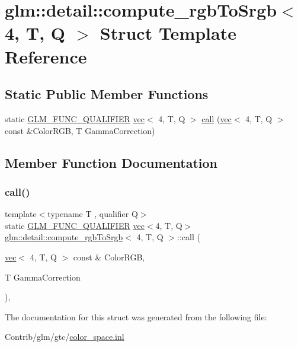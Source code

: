 \hypertarget{structglm_1_1detail_1_1compute__rgb_to_srgb_3_014_00_01_t_00_01_q_01_4}{}\section{glm\+:\+:detail\+:\+:compute\+\_\+rgb\+To\+Srgb$<$ 4, T, Q $>$ Struct Template Reference}
\label{structglm_1_1detail_1_1compute__rgb_to_srgb_3_014_00_01_t_00_01_q_01_4}
\subsection*{Static Public Member Functions}
\begin{DoxyCompactItemize}
\item 
static \mbox{\hyperlink{setup_8hpp_a33fdea6f91c5f834105f7415e2a64407}{G\+L\+M\+\_\+\+F\+U\+N\+C\+\_\+\+Q\+U\+A\+L\+I\+F\+I\+ER}} \mbox{\hyperlink{structglm_1_1vec}{vec}}$<$ 4, T, Q $>$ \mbox{\hyperlink{structglm_1_1detail_1_1compute__rgb_to_srgb_3_014_00_01_t_00_01_q_01_4_aedf4da586350c728943a249325c9d9c9}{call}} (\mbox{\hyperlink{structglm_1_1vec}{vec}}$<$ 4, T, Q $>$ const \&Color\+R\+GB, T Gamma\+Correction)
\end{DoxyCompactItemize}


\subsection{Member Function Documentation}
\mbox{\label{structglm_1_1detail_1_1compute__rgb_to_srgb_3_014_00_01_t_00_01_q_01_4_aedf4da586350c728943a249325c9d9c9}} 
\subsubsection{\texorpdfstring{call()}{call()}}
{\footnotesize\ttfamily template$<$typename T , qualifier Q$>$ \\
static \mbox{\hyperlink{setup_8hpp_a33fdea6f91c5f834105f7415e2a64407}{G\+L\+M\+\_\+\+F\+U\+N\+C\+\_\+\+Q\+U\+A\+L\+I\+F\+I\+ER}} \mbox{\hyperlink{structglm_1_1vec}{vec}}$<$4, T, Q$>$ \mbox{\hyperlink{structglm_1_1detail_1_1compute__rgb_to_srgb}{glm\+::detail\+::compute\+\_\+rgb\+To\+Srgb}}$<$ 4, T, Q $>$\+::call (\begin{DoxyParamCaption}\item[{\mbox{\hyperlink{structglm_1_1vec}{vec}}$<$ 4, T, Q $>$ const \&}]{Color\+R\+GB,  }\item[{T}]{Gamma\+Correction }\end{DoxyParamCaption})\hspace{0.3cm}{\ttfamily [inline]}, {\ttfamily [static]}}



The documentation for this struct was generated from the following file\+:\begin{DoxyCompactItemize}
\item 
Contrib/glm/gtc/\mbox{\hyperlink{gtc_2color__space_8inl}{color\+\_\+space.\+inl}}\end{DoxyCompactItemize}
